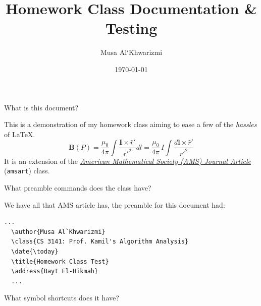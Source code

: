 \documentclass{homework}
\author{Musa Al`Khwarizmi}
\date{\today}
\title{\LaTeXe{} Homework Class Documentation \& Testing}
\renewcommand\tt[1]{\texttt{#1}}
\newcommand{\amslink}{%
  \href{https://ctan.org/pkg/amsart}{%
    \textit{American Mathematical Society (AMS) Journal Article} %
  }}
\begin{document}
 \maketitle

\question What is this document?

\begin{sol}
  This is a demonstration of my homework class aiming to ease a few of
  the \textit{hassles} of \LaTeX{}.
  \[
    \mathbf{B}(P) = \frac{\mu_0}{4\pi}
    \int\frac{\mathbf{I}\times\hat{r}'}{r'^2}dl = \frac{\mu_0}{4\pi}\,I\!
    \int\frac{d\boldsymbol{l}\times\hat{r}'}{r'^2}
  \]
  It is an extension of the \amslink (\tt{amsart}) class.
\end{sol}

\question What preamble commands does the class have?

\begin{sol}
  We have all that AMS article has, the preamble for this document had:
  \begin{lstlisting}[language={[LaTeX]TeX}]
  ...
  \author{Musa Al`Khwarizmi}
  \class{CS 3141: Prof. Kamil's Algorithm Analysis}
  \date{\today}
  \title{Homework Class Test}
  \address{Bayt El-Hikmah}
  ...
\end{lstlisting}
\end{sol}

\question What symbol shortcuts does it have?
\end{document}
